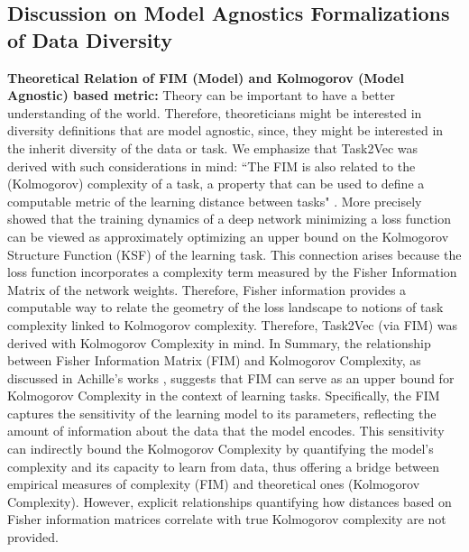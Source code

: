 \subsection{Discussion on Model Agnostics Formalizations of Data Diversity}\label{kolmogorov_fisher_relation}
\textbf{Theoretical Relation of FIM (Model) and Kolmogorov (Model Agnostic) based metric: } 
Theory can be important to have a better understanding of the world. 
Therefore, theoreticians might be interested in diversity definitions that are model agnostic, since, they might be interested in the inherit diversity of the data or task. 
We emphasize that Task2Vec was derived with such considerations in mind: 
``The FIM is also related to the (Kolmogorov) complexity of a task, a property that can be used to define a computable metric of the learning distance between tasks" \citep{task2vec}.
More precisely \citep{AchilleMbengSoatto2018} showed that the training dynamics of a deep network minimizing a loss function can be viewed as approximately optimizing an upper bound on the Kolmogorov Structure Function (KSF) of the learning task. 
This connection arises because the loss function incorporates a complexity term measured by the Fisher Information Matrix of the network weights. 
Therefore, Fisher information provides a computable way to relate the geometry of the loss landscape to notions of task complexity linked to Kolmogorov complexity. 
Therefore, Task2Vec (via FIM) was derived with Kolmogorov Complexity in mind. 
In Summary, the relationship between Fisher Information Matrix (FIM) and Kolmogorov Complexity, as discussed in Achille's works \citep{task2vec, AchilleMbengSoatto2018, achille2019dynamics, AchillePaoliniMbengSoatto2021}, suggests that FIM can serve as an upper bound for Kolmogorov Complexity in the context of learning tasks. 
Specifically, the FIM captures the sensitivity of the learning model to its parameters, reflecting the amount of information about the data that the model encodes. 
This sensitivity can indirectly bound the Kolmogorov Complexity by quantifying the model's complexity and its capacity to learn from data, thus offering a bridge between empirical measures of complexity (FIM) and theoretical ones (Kolmogorov Complexity).
However, explicit relationships quantifying how distances based on Fisher information matrices correlate with true Kolmogorov complexity are not provided.

